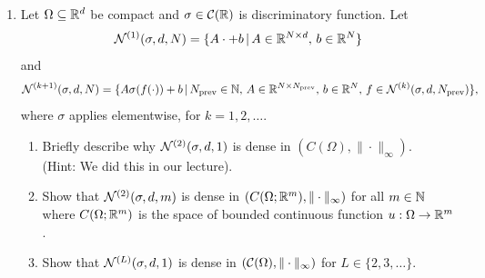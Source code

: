 \documentclass[12pt]{article}
\begin{document}
\begin{enumerate}
\begin{solution}
\end{solution}

\begin{problem}
   \newpage 
\end{problem}
\begin{solution}
\vskip .2in
\end{solution}

\item Let $\Omega\subseteq{\mathbb{R}}^d$ be compact and $\sigma\in {\mathcal{C}}({\mathbb{R}})$ is discriminatory function.
Let 
\[
{\mathcal{N}}^{(1)}(\sigma,d,N)=\{A\cdot +b\,|\,A\in {\mathbb{R}}^{N\times d},\,b\in {\mathbb{R}}^{N}\}
\]
and
\[
{\mathcal{N}}^{(k+1)}(\sigma,d,N)=\{A\sigma(f(\cdot))+b\,|\,
N_\mathrm{prev}\in \mathbb{N},\,
A\in {\mathbb{R}}^{N\times N_\mathrm{prev}},\,b\in {\mathbb{R}}^{N},\,f\in {\mathcal{N}}^{(k)}(\sigma,d,N_\mathrm{prev})\},
\]
where $\sigma$ applies elementwise, for $k=1,2,\dots$.
\begin{enumerate}
    \item Briefly describe why ${\mathcal{N}}^{(2)}(\sigma, d, 1)$ is dense in $(C(\Omega), \|\cdot \|_\infty)$.\\
    (Hint: We did this in our lecture).
    \item Show that ${\mathcal{N}}^{(2)}(\sigma, d, m)$ is dense in  $(C(\Omega;{\mathbb{R}}^m), \|\cdot \|_\infty)$ for all $m\in{\mathbb{N}}$
    where $C(\Omega; {\mathbb{R}}^m)$ is the space of bounded continuous function $u:\Omega\rightarrow {\mathbb{R}}^m$.
    \item Show that ${\mathcal{N}}^{(L)}(\sigma,d,1)$ is dense in $({\mathcal{C}}(\Omega),\|\cdot\|_\infty)$ for $L\in \{2,3,\ldots\}$. 
\end{enumerate}
\end{enumerate}
\end{document}
